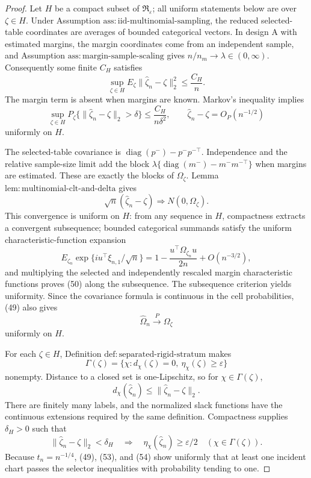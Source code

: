 \documentclass{article}
\begin{document}
\begin{proof}
Let \(H\) be a compact subset of \(\mathfrak R_{\varepsilon}\); all uniform statements below are over \(\zeta\in H\).  Under Assumption \(\mathrm{ass{:}iid\text{-}multinomial\text{-}sampling}\), the reduced selected-table coordinates are averages of bounded categorical vectors.  In design A with estimated margins, the margin coordinates come from an independent sample, and Assumption \(\mathrm{ass{:}margin\text{-}sample\text{-}scaling}\) gives \(n/n_m\to\lambda\in(0,\infty)\).  Consequently some finite \(C_H\) satisfies
\[
 \sup_{\zeta\in H}
 E_{\zeta}\|\widehat\zeta_n-\zeta\|_2^2
 \le \frac{C_H}{n}.                                      \tag{48}
\]
The margin term is absent when margins are known.  Markov's inequality implies
\[
 \sup_{\zeta\in H}P_{\zeta}
 \{\|\widehat\zeta_n-\zeta\|_2>\delta\}
 \le\frac{C_H}{n\delta^2},
 \qquad
 \widehat\zeta_n-\zeta=O_P(n^{-1/2})                    \tag{49}
\]
uniformly on \(H\).

The selected-table covariance is
\(\operatorname{diag}(p^-)-p^-p^{-\top}\).  Independence and the relative sample-size limit add the block
\(\lambda\{\operatorname{diag}(m^-)-m^-m^{-\top}\}\) when margins are estimated.  These are exactly the blocks of \(\Omega_{\zeta}\).  Lemma \(\mathrm{lem{:}multinomial\text{-}clt\text{-}and\text{-}delta}\) gives
\[
 \sqrt n(\widehat\zeta_n-\zeta)
 \Rightarrow N(0,\Omega_{\zeta}).                         \tag{50}
\]
This convergence is uniform on \(H\): from any sequence in \(H\), compactness extracts a convergent subsequence; bounded categorical summands satisfy the uniform characteristic-function expansion
\[
 E_{\zeta_n}\exp\{iu^{\top}\xi_{n,1}/\sqrt n\}
 =1-\frac{u^{\top}\Omega_{\zeta_n}u}{2n}+O(n^{-3/2}),    \tag{51}
\]
and multiplying the selected and independently rescaled margin characteristic functions proves (50) along the subsequence.  The subsequence criterion yields uniformity.  Since the covariance formula is continuous in the cell probabilities, (49) also gives
\[
 \widehat\Omega_n\xrightarrow{P}\Omega_{\zeta}          \tag{52}
\]
uniformly on \(H\).

For each \(\zeta\in H\), Definition \(\mathrm{def{:}separated\text{-}rigid\text{-}stratum}\) makes
\[
 \Gamma(\zeta)=\{\chi:d_{\chi}(\zeta)=0,
                    \ \eta_{\chi}(\zeta)\ge\varepsilon\}
\]
nonempty.  Distance to a closed set is one-Lipschitz, so for \(\chi\in\Gamma(\zeta)\),
\[
 d_{\chi}(\widehat\zeta_n)
 \le\|\widehat\zeta_n-\zeta\|_2.                       \tag{53}
\]
There are finitely many labels, and the normalized slack functions have the continuous extensions required by the same definition.  Compactness supplies \(\delta_H>0\) such that
\[
 \|\widehat\zeta_n-\zeta\|_2<\delta_H
 \quad\Longrightarrow\quad
 \eta_{\chi}(\widehat\zeta_n)\ge\varepsilon/2
 \quad(\chi\in\Gamma(\zeta)).                           \tag{54}
\]
Because \(t_n=n^{-1/4}\), (49), (53), and (54) show uniformly that at least one incident chart passes the selector inequalities with probability tending to one.


\end{proof}
\end{document}
